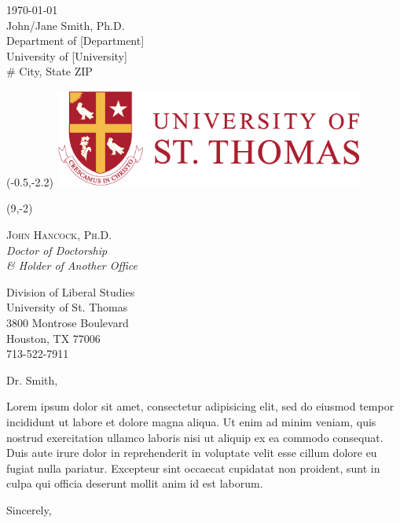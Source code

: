 \documentclass[letterpaper,12pt]{letter}
\date{}
\begin{document}
\begin{letter}{
	\today \\\bigskip %
	John/Jane Smith, Ph.D. \\
	Department of [Department] \\
	University of [University] \\
	\# City, State ZIP
}
                           
\begin{textblock}{4}(-0.5,-2.2)
\noindent
\hspace*{-0.35cm}\includegraphics[width=4in]{img/ust-logo.eps}
\end{textblock}

{
	\footnotesize %
	\usttext\begin{textblock}{3}(9,-2)
		{
			\color{ustred}
			\noindent
			\textsc{John Hancock, Ph.D.}\\ %
			\emph{Doctor of Doctorship \\ \& Holder of Another Office} %
			
			Division of Liberal Studies \\			
			University of St. Thomas \\
			3800 Montrose Boulevard \\
			Houston, TX 77006 \\
			713-522-7911
		}
	\end{textblock}
}

	\opening{Dr. Smith,}

Lorem ipsum dolor sit amet, consectetur adipisicing elit, sed do eiusmod tempor incididunt ut labore et dolore magna aliqua. Ut enim ad minim veniam, quis nostrud exercitation ullamco laboris nisi ut aliquip ex ea commodo consequat. Duis aute irure dolor in reprehenderit in voluptate velit esse cillum dolore eu fugiat nulla pariatur. Excepteur sint occaecat cupidatat non proident, sunt in culpa qui officia deserunt mollit anim id est laborum.


\closing{\vspace{1cm}Sincerely,}
\end{letter}
\end{document}
